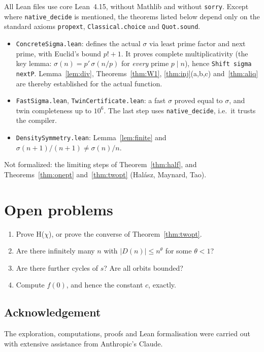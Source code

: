 \documentclass[11pt]{amsart}
\theoremstyle{remark}
\newcommand{\s}{\sigma}
\newcommand{\nx}[1]{#1'}
\begin{document}
All Lean files use core Lean~4.15, without Mathlib and without \texttt{sorry}. Except where \texttt{native\_decide} is mentioned, the theorems listed below depend only on the standard axioms \texttt{propext}, \texttt{Classical.choice} and \texttt{Quot.sound}.
\begin{itemize}
\item \texttt{ConcreteSigma.lean}: defines the actual $\s$ via least prime factor and next prime, with Euclid's bound $p!+1$. It proves complete multiplicativity (the key lemma: $\s(n)=\nx p\,\s(n/p)$ for \emph{every} prime $p\mid n$), hence \texttt{Shift sigma nextP}. Lemma~\ref{lem:div}, Theorems~\ref{thm:W1}, \ref{thm:inj}(a,b,c) and~\ref{thm:aliq} are thereby established for the actual function.
\item \texttt{FastSigma.lean}, \texttt{TwinCertificate.lean}: a fast $\s$ proved equal to $\s$, and twin completeness up to $10^6$. The last step uses \texttt{native\_decide}, i.e.\ it trusts the compiler.
\item \texttt{DensitySymmetry.lean}: Lemma~\ref{lem:finite} and $\s(n+1)/(n+1)\ne\s(n)/n$.
\end{itemize}
Not formalized: the limiting steps of Theorem~\ref{thm:half}, and Theorems~\ref{thm:onept} and~\ref{thm:twopt} (Hal\'asz, Maynard, Tao).

\section{Open problems}
\begin{enumerate}
\item Prove H($\chi$), or prove the converse of Theorem~\ref{thm:twopt}.
\item Are there infinitely many $n$ with $|D(n)|\le n^\theta$ for some $\theta<1$?
\item Are there further cycles of $s$? Are all orbits bounded?
\item Compute $f(0)$, and hence the constant $c$, exactly.
\end{enumerate}

\subsection*{Acknowledgement}
The exploration, computations, proofs and Lean formalisation were carried out with extensive assistance from Anthropic's Claude.
\end{document}
